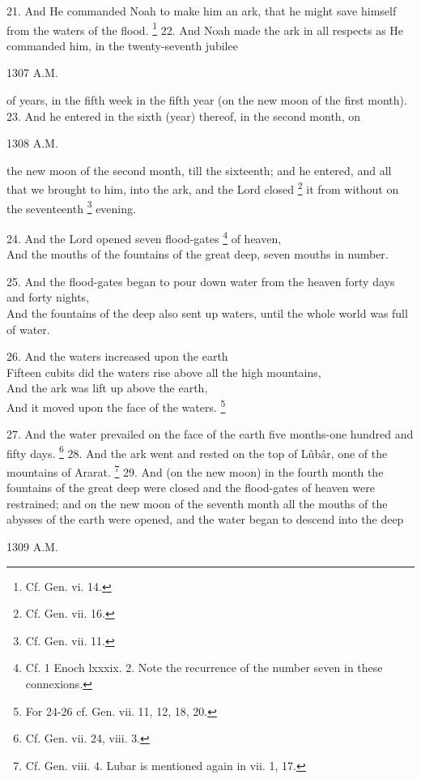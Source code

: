 
21. And He commanded Noah to make him an ark, that he might save himself from the waters of the flood. \footnote{Cf. Gen. vi. 14.} 22. And Noah made the ark in all respects as He commanded him, in the twenty-seventh jubilee

1307 A.M.

of years, in the fifth week in the fifth year (on the new moon of the first month). 23. And he entered in the sixth (year) thereof, in the second month, on

1308 A.M.

the new moon of the second month, till the sixteenth; and he entered, and all that we brought to him, into the ark, and the Lord closed \footnote{Cf. Gen. vii. 16.} it from without on the seventeenth \footnote{Cf. Gen. vii. 11.} evening.

24. And the Lord opened seven flood-gates \footnote{Cf. 1 Enoch lxxxix. 2. Note the recurrence of the number seven in these connexions.} of heaven,\\
And the mouths of the fountains of the great deep, seven mouths in number.

25. And the flood-gates began to pour down water from the heaven forty days and forty nights,\\
And the fountains of the deep also sent up waters, until the whole world was full of water.

26. And the waters increased upon the earth\\
Fifteen cubits did the waters rise above all the high mountains, \\
And the ark was lift up above the earth,\\
And it moved upon the face of the waters. \footnote{For 24-26 cf. Gen. vii. 11, 12, 18, 20.}

27. And the water prevailed on the face of the earth five months-one hundred and fifty days. \footnote{Cf. Gen. vii. 24, viii. 3.} 28. And the ark went and rested on the top of Lûbâr, one of the mountains of Ararat. \footnote{Cf. Gen. viii. 4. Lubar is mentioned again in vii. 1, 17.} 29. And (on the new moon) in the fourth month the fountains of the great deep were closed and the flood-gates of heaven were restrained; and on the new moon of the seventh month all the mouths of the abysses of the earth were opened, and the water began to descend into the deep

1309 A.M.

